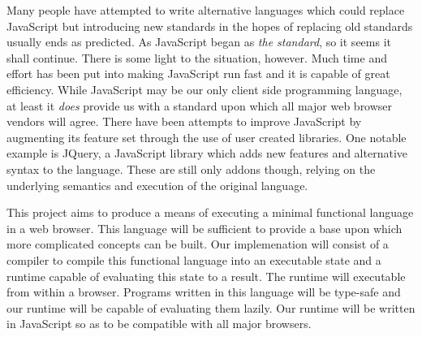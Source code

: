 Many people have attempted to
write alternative languages which could replace JavaScript but 
introducing new standards in the hopes of replacing old standards
usually ends as predicted. As JavaScript began as \emph{the
standard}, so it seems it shall continue. There is some light to the
situation, however. Much time and effort has been put into making 
JavaScript run fast and it is capable of great efficiency. While 
JavaScript may be our only client side programming language, at least
it \emph{does} provide us with a standard upon which all major web 
browser vendors will agree. There have been attempts
to improve JavaScript by augmenting its feature set through the use
of user created libraries. One notable example is JQuery, a JavaScript
library which adds new features and alternative syntax to the language.
These are still only addons though, relying on the underlying semantics
and execution of the original language. 

This project aims to produce a means of executing a minimal functional language in a
web browser. This language will be sufficient to provide a base upon which more 
complicated concepts can be built. Our implemenation will consist of a compiler to 
compile this functional language into an executable state and a runtime capable of 
evaluating this state to a result. The runtime will executable from within a browser.
Programs written in this language will be type-safe and our runtime will be capable
of evaluating them lazily. Our runtime will be written in JavaScript so as to be 
compatible with all major browsers.
